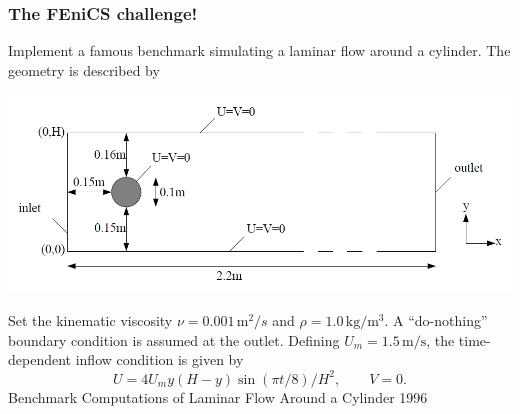 \begin{frame}[shrink=5]
    \frametitle{The FEniCS challenge!}
    Implement a famous benchmark simulating a laminar flow around 
    a cylinder. The geometry is described by
    \begin{center}
        \includegraphics[width=1.0\textwidth]{png/turek_benchmark.png}
    \end{center}
    Set the  kinematic viscosity $\nu = 0.001\, \mathrm{m^2}/s$ and
    $\rho = 1.0\, \mathrm{kg}/\mathrm{m}^3$.
    A ``do-nothing'' boundary condition is assumed at the outlet.
    Defining $U_m = 1.5\,\mathrm{m}/\mathrm{s}$,
    the time-dependent inflow condition is given by
    \begin{equation*}
        U = 4 U_m y (H - y) \sin(\pi t/8)/H^2, \qquad V = 0.
    \end{equation*}
              {Benchmark Computations of Laminar Flow Around a
              Cylinder}
              {1996}
\end{frame}
